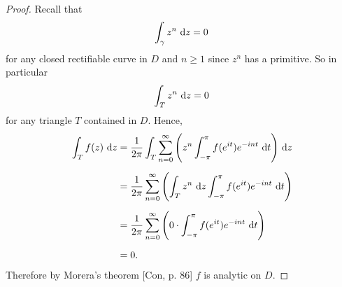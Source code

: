 \documentclass[11pt,oneside,english]{amsart}
\theoremstyle{definition}
\begin{document}
\begin{enumerate}[leftmargin=*]
\begin{proof}
Recall that
\[
\int_\gamma z^n\,\dif{z}=0
\]
for any closed rectifiable curve in $D$ and $n\geq 1$ since $z^n$ has a primitive. So in particular 
\[
\int_T z^n\,\dif{z}=0
\]
for any triangle $T$ contained in $D$. Hence,
\begin{align*}
\int_Tf(z)\,\dif{z}&=\frac{1}{2\pi}\int_T\sum_{n=0}^\infty\left(z^n\int_{-\pi}^\pi f(e^{it})e^{-int}\,\dif{t}\right)\,\dif{z}\\[2mm]
&=\frac{1}{2\pi}\sum_{n=0}^\infty\left(\int_Tz^n\,\dif{z}\int_{-\pi}^\pi f(e^{it})e^{-int}\,\dif{t}\right)\\[2mm]
&=\frac{1}{2\pi}\sum_{n=0}^\infty\left(0\cdot\int_{-\pi}^\pi f(e^{it})e^{-int}\,\dif{t}\right)\\[2mm]
&=0.
\end{align*}
Therefore by Morera's theorem [Con, p. 86] $f$ is analytic on $D$.
\end{proof}

\end{enumerate}
\end{document}
